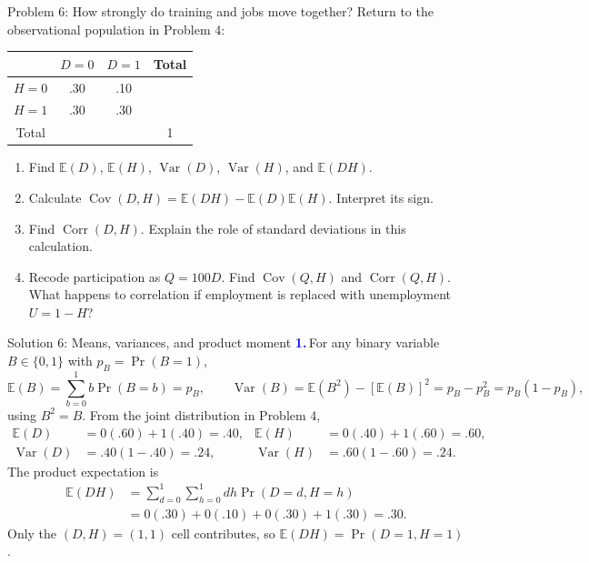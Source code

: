 \documentclass[notes,10pt, aspectratio=169]{beamer}
\newif\ifshowsolutions
\newcommand{\E}{\mathbb{E}}
\newcommand{\Var}{\operatorname{Var}}
\newcommand{\Cov}{\operatorname{Cov}}
\newcommand{\Corr}{\operatorname{Corr}}
\newcommand{\answerpart}[1]{\textcolor{blue}{\textbf{#1.}}\,}
\newcommand{\jobtable}{%
\begin{center}
\begin{tabular}{c|cc|c}
 & $D=0$ & $D=1$ & Total \\ \hline
$H=0$ & .30 & .10 & \\
$H=1$ & .30 & .30 & \\ \hline
Total & & & 1
\end{tabular}
\end{center}}
\begin{document}
\begin{frame}{Problem 6: How strongly do training and jobs move together?}
Return to the observational population in Problem 4:
\jobtable
\begin{enumerate}
\setlength{\itemsep}{7pt}
\item Find $\E(D)$, $\E(H)$, $\Var(D)$, $\Var(H)$, and $\E(DH)$.
\item Calculate $\Cov(D,H)=\E(DH)-\E(D)\E(H)$. Interpret its sign.
\item Find $\Corr(D,H)$. Explain the role of standard deviations in this calculation.
\item Recode participation as $Q=100D$. Find $\Cov(Q,H)$ and $\Corr(Q,H)$. What happens to correlation if employment is replaced with unemployment $U=1-H$?
\end{enumerate}
\end{frame}

\ifshowsolutions
\begin{frame}{Solution 6: Means, variances, and product moment}
\small
\answerpart{1}For any binary variable $B\in\{0,1\}$ with $p_B=\Pr(B=1)$,
\[
\E(B)=\sum_{b=0}^1 b\Pr(B=b)=p_B,\qquad
\Var(B)=\E(B^2)-[\E(B)]^2=p_B-p_B^2=p_B(1-p_B),
\]
using $B^2=B$. From the joint distribution in Problem 4,
\begin{align*}
\E(D)&=0(.60)+1(.40)=.40,
&\E(H)&=0(.40)+1(.60)=.60,\\
\Var(D)&=.40(1-.40)=.24,
&\Var(H)&=.60(1-.60)=.24.
\end{align*}
The product expectation is
\begin{align*}
\E(DH)&=\sum_{d=0}^1\sum_{h=0}^1 dh\Pr(D=d,H=h)\\
&=0(.30)+0(.10)+0(.30)+1(.30)=.30.
\end{align*}
Only the $(D,H)=(1,1)$ cell contributes, so $\E(DH)=\Pr(D=1,H=1)$.
\end{frame}
\end{document}
